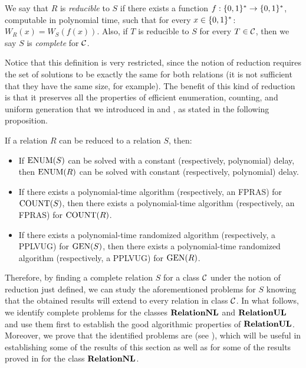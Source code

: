 \documentclass[11pt,twoside=off,numbers=noenddot]{scrbook}
\begin{document}
\begin{definition}
    We say that $R$ is \emph{reducible} to $S$ if there exists a function $f : \{ 0, 1 \}^\ast \to \{ 0, 1 \}^\ast$, computable in polynomial time, such that for every $x \in \{ 0, 1 \}^\ast$: $W_R(x) = W_S(f(x))$. Also, if $T$ is reducible to $S$ for every $T \in \mathcal{C}$, then we say $S$ is \emph{complete} for $\mathcal{C}$.
\end{definition}

Notice that this definition is very restricted, since the notion of reduction requires the set of solutions to be exactly the same for both relations (it is not sufficient that they have the same size, for example). The benefit of this kind of reduction is that it preserves all the properties of efficient enumeration, counting, and uniform generation that we introduced in  and , as stated in the following proposition.

\begin{proposition}
    If a relation $R$ can be reduced to a relation $S$, then:
    \begin{itemize}
        \item If $\text{ENUM}(S)$ can be solved with a constant (respectively, polynomial) delay, then $\text{ENUM}(R)$ can be solved with constant (respectively, polynomial) delay.
        \item If there exists a polynomial-time algorithm (respectively, an FPRAS) for $\text{COUNT}(S)$, then there exists a polynomial-time algorithm (respectively, an FPRAS) for $\text{COUNT}(R)$.
        \item If there exists a polynomial-time randomized algorithm (respectively, a PPLVUG) for $\text{GEN}(S)$, then there exists a polynomial-time randomized algorithm (respectively, a PPLVUG) for $\text{GEN}(R)$.
    \end{itemize}
\end{proposition}

Therefore, by finding a complete relation $S$ for a class $\mathcal{C}$ under the notion of reduction just defined, we can study the aforementioned problems for $S$ knowing that the obtained results will extend to every relation in class $\mathcal{C}$. In what follows, we identify complete problems for the classes $\textbf{RelationNL}$ and $\textbf{RelationUL}$ and use them first to establish the good algorithmic properties of $\textbf{RelationUL}$. Moreover, we prove that the identified problems are  (see \cite{jerrum1986random}), which will be useful in establishing some of the results of this section as well as for some of the results proved in  for the class $\textbf{RelationNL}$.
\end{document}
